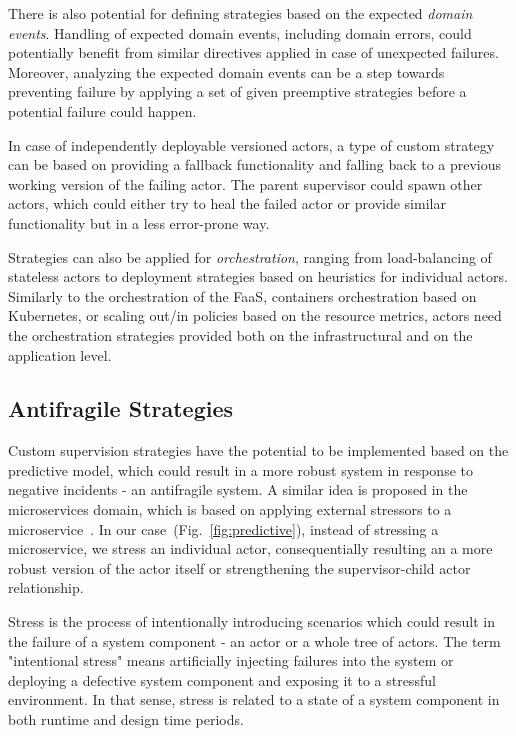 \documentclass[conference]{IEEEtran}
\begin{document}
There is also potential for defining strategies based on the expected \textit{domain events}. Handling of expected domain events, including domain errors, could potentially benefit from similar directives applied in case of unexpected failures. Moreover, analyzing the expected domain events can be a step towards preventing failure by applying a set of given preemptive strategies before a potential failure could happen.

In case of independently deployable versioned actors, a type of custom strategy can be based on providing a fallback functionality and falling back to a previous working version of the failing actor. The parent supervisor could spawn other actors, which could either try to heal the failed actor or provide similar functionality but in a less error-prone way.

Strategies can also be applied for \textit{orchestration}, ranging from load-balancing of stateless actors to deployment strategies based on heuristics\cite{tardieu_reliable_2022} for individual actors. Similarly to the orchestration of the FaaS, containers orchestration based on Kubernetes, or scaling out/in policies based on the resource metrics, actors need the orchestration strategies provided both on the infrastructural and on the application level.



\subsection{Antifragile Strategies}

Custom supervision strategies have the potential to be implemented based on the predictive model, which could result in a more robust system in response to negative incidents - an antifragile system. A similar idea is proposed in the microservices domain, which is based on applying external stressors to a microservice~\cite{hind-iotbds22,hind-icsme2022}. In our case~(Fig.~\ref{fig:predictive}), instead of stressing a microservice, we stress an individual actor, consequentially resulting an a more robust version of the actor itself or strengthening the supervisor-child actor relationship.

Stress is the process of intentionally introducing scenarios which could result in the failure of a system component - an actor or a whole tree of actors. The term "intentional stress" means artificially injecting failures into the system or deploying a defective system component and exposing it to a stressful environment. In that sense, stress is related to a state of a system component in both runtime and design time periods.
\end{document}
